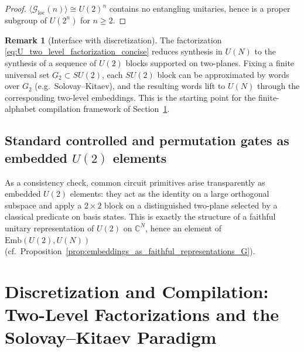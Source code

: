 \documentclass{article}%
\theoremstyle{definition}
\newtheorem{remark}[theorem]{Remark}
\numberwithin{equation}{section}
\newcommand{\C}{\mathbb{C}}
\newcommand{\Emb}{\mathrm{Emb}}
\begin{document}
\begin{proof}
$\langle \mathcal{G}_{\mathrm{loc}}(n)\rangle\cong U(2)^n$ contains no entangling unitaries, hence is a proper subgroup of $U(2^n)$
for $n\ge2$.
\end{proof}

\begin{remark}[Interface with discretization]
\label{rem:universality_to_discretization_concise}
The factorization \eqref{eq:U_two_level_factorization_concise} reduces synthesis in $U(N)$ to the synthesis of a sequence of $U(2)$
blocks supported on two-planes. Fixing a finite universal set $G_2\subset SU(2)$, each $SU(2)$ block can be approximated by words over
$G_2$ (e.g.\ Solovay--Kitaev), and the resulting words lift to $U(N)$ through the corresponding two-level embeddings. This is the
starting point for the finite-alphabet compilation framework of Section~\ref{sec:SK}.
\end{remark}

\subsection{Standard controlled and permutation gates as embedded $U(2)$ elements}
\label{subsec:standard_gates_as_embeddings}

\noindent
As a consistency check, common circuit primitives arise transparently as embedded $U(2)$ elements: they act as the identity on a large
orthogonal subspace and apply a $2\times2$ block on a distinguished two-plane selected by a classical predicate on basis states. This is
exactly the structure of a faithful unitary representation of $U(2)$ on $\C^N$, hence an element of $\Emb(U(2),U(N))$
(cf.\ Proposition~\ref{prop:embeddings_as_faithful_representations_G}).


\section{Discretization and Compilation: Two-Level Factorizations and the Solovay--Kitaev Paradigm}
\label{sec:SK}
\end{document}

